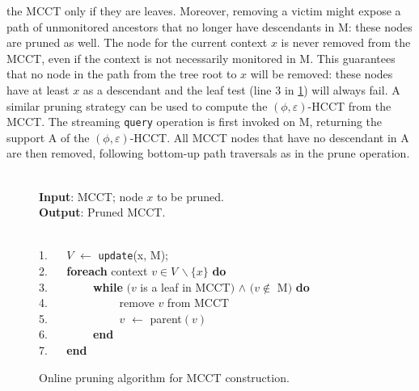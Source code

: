 \noindent
\fi
the MCCT only if they are leaves. Moreover, removing a victim might expose a path of unmonitored ancestors that no longer have descendants in M: these nodes are pruned as well. The node for the current context $x$ is never removed from the MCCT, even if the context is not necessarily monitored in M. This guarantees that no node in the path from the tree root to $x$ will be removed: these nodes have at least $x$ as a descendant and the leaf test (line 3 in \myalgorithm\ref{alg:hcct-update}) will always fail.
A similar pruning strategy can be used to compute the $(\phi,\varepsilon)$-HCCT from the MCCT. The streaming {\tt query} operation is first invoked on M, returning the support A of the $(\phi,\varepsilon)$-HCCT. All MCCT nodes that have no descendant in A are then removed, following bottom-up path traversals as in the prune operation.

\ifx\noauthorea\undefined
\begin{figure}[ht]
\caption{\label{alg:hcct-update} Online pruning algorithm for MCCT construction.}
\begin{small}
\begin{minipage}{0.9\textwidth}
\hrulefill\\
\textbf{Input}: {MCCT; node $x$ to be pruned.}\\
\textbf{Output}: {Pruned MCCT.}

\vspace{-1mm}
\hrulefill\\
1. ~~ $V$ $\gets$ {\tt update}(x, M);\\
2. ~~ \textbf{foreach} context $v\in V\,\backslash \{x\}$ \textbf{do}\\
3. ~~ ~~~~ \textbf{while} $(v$ is a leaf in MCCT$)$ $\wedge$ $(v\not\in$ M$)$ \textbf{do}\\
4. ~~ ~~~~ ~~~~ remove $v$ from MCCT\\
5. ~~ ~~~~ ~~~~ $v$ $\gets$ parent$(v)$\\
6. ~~ ~~~~ \textbf{end}\\
7. ~~ \textbf{end}

\vspace{-1mm}
\hrulefill
\vspace{-2mm}
\end{minipage}
\end{small}
\end{figure}
\fi

\ifauthorea{\newline}{}
